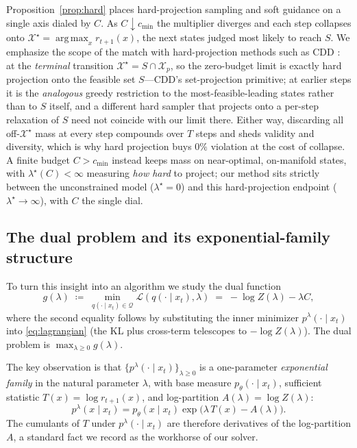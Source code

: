 \documentclass{article}
\DeclareMathOperator*{\argmax}{arg\,max}
\newcommand{\X}{\mathcal{X}}
\newcommand{\Q}{\mathcal{Q}}
\newcommand{\lstar}{\lambda^{\star}}
\newcommand{\qlam}{p^{\lambda}(\cdot\mid x_t)}
\begin{document}
Proposition~\ref{prop:hard} places hard-projection sampling and soft guidance on a single axis dialed by $C$. As $C\downarrow c_{\min}$ the multiplier diverges and each step collapses onto $\X^\star=\argmax_x r_{t+1}(x)$, the next states judged most likely to reach $S$. We emphasize the scope of the match with hard-projection methods such as CDD \cite{cardei2025cdd}: at the \emph{terminal} transition $\X^\star=S\cap\X_p$, so the zero-budget limit is exactly hard projection onto the feasible set $S$---CDD's set-projection primitive; at earlier steps it is the \emph{analogous} greedy restriction to the most-feasible-leading states rather than to $S$ itself, and a different hard sampler that projects onto a per-step relaxation of $S$ need not coincide with our limit there. Either way, discarding all off-$\X^\star$ mass at every step compounds over $T$ steps and sheds validity and diversity, which is why hard projection buys $0\%$ violation at the cost of collapse. A finite budget $C>c_{\min}$ instead keeps mass on near-optimal, on-manifold states, with $\lstar(C)<\infty$ measuring \emph{how hard} to project; our method sits strictly between the unconstrained model ($\lstar=0$) and this hard-projection endpoint ($\lstar\to\infty$), with $C$ the single dial.

\subsection{The dual problem and its exponential-family structure}
To turn this insight into an algorithm we study the dual function
\begin{equation}
\label{eq:dual}
g(\lambda)\;\coloneqq\;\min_{q(\cdot\mid x_t)\in\Q}\mathcal L(q(\cdot\mid x_t),\lambda)
\;=\;-\log Z(\lambda)-\lambda C,
\end{equation}
where the second equality follows by substituting the inner minimizer $\qlam$ into \eqref{eq:lagrangian} (the KL plus cross-term telescopes to $-\log Z(\lambda)$). The dual problem is $\max_{\lambda\ge 0} g(\lambda)$.

The key observation is that $\{\qlam\}_{\lambda\ge0}$ is a one-parameter \emph{exponential family} in the natural parameter $\lambda$, with base measure $p_\theta(\cdot\mid x_t)$, sufficient statistic $T(x)=\log r_{t+1}(x)$, and log-partition $A(\lambda)=\log Z(\lambda)$:
\begin{equation}
p^{\lambda}(x\mid x_t)=p_\theta(x\mid x_t)\exp\!\big(\lambda\,T(x)-A(\lambda)\big).
\end{equation}
The cumulants of $T$ under $\qlam$ are therefore derivatives of the log-partition $A$, a standard fact we record as the workhorse of our solver.
\end{document}

